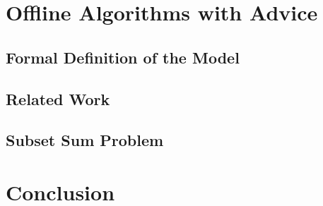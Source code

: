 \documentclass[12pt,a4paper]{report}
\begin{document}
\chapter{Offline Algorithms with Advice}
\label{chapter:offline}

\section{Formal Definition of the Model}
\label{section:offline-definition}

\section{Related Work}
\label{section:offline-related}

\section{Subset Sum Problem}
\label{section:subset-sum}


\chapter*{Conclusion}
\label{chapter:conclusion}



\printbibliography

\appendix

%
\end{document}
